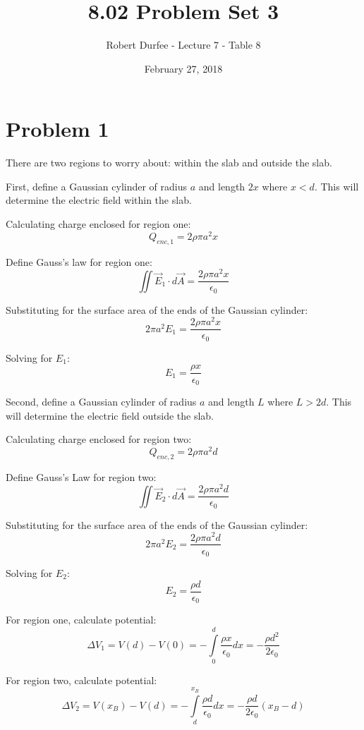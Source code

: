 \documentclass{article}
\title{ 8.02 Problem Set 3 }
\author{ Robert Durfee - Lecture 7 - Table 8 }
\date{ February 27, 2018 }
\begin{document}
\maketitle

\section*{ Problem 1 }

There are two regions to worry about: within the slab and outside the slab.

\bigbreak

First, define a Gaussian cylinder of radius $a$ and length $2x$ where $x < d$.
This will determine the electric field within the slab.

\bigbreak

Calculating charge enclosed for region one:
$$ Q_{enc,1} = 2 \rho \pi a^{2} x $$

Define Gauss's law for region one:
$$ \iint \vec{E}_{1} \cdot d\vec{A} = \frac{ 2 \rho \pi a^{2} x }{ \epsilon_{0} } $$

Substituting for the surface area of the ends of the Gaussian cylinder:
$$ 2 \pi a^{2} E_{1} = \frac{ 2 \rho \pi a^{2} x }{ \epsilon_{0} } $$

Solving for $E_{1}$:
$$ E_{1} = \frac{ \rho x }{ \epsilon_{0} }$$

Second, define a Gaussian cylinder of radius $a$ and length $L$ where $L > 2d$.
This will determine the electric field outside the slab.

\bigbreak

Calculating charge enclosed for region two:
$$ Q_{enc,2} = 2 \rho \pi a^{2} d$$

Define Gauss's Law for region two:
$$ \iint \vec{E}_{2} \cdot d\vec{A} = \frac{ 2 \rho \pi a^{2} d }{ \epsilon_{0} } $$

Substituting for the surface area of the ends of the Gaussian cylinder:
$$ 2 \pi a^{2} E_{2} = \frac{ 2 \rho \pi a^{2} d }{ \epsilon_{0} } $$

Solving for $E_{2}$:
$$ E_{2} = \frac{ \rho d }{ \epsilon_{0} } $$

For region one, calculate potential:
$$ \Delta V_{1} = V(d) - V(0) = - \int\limits_{0}^{d} \frac{ \rho x }{
\epsilon_{0} } dx = -\frac{ \rho d^{2} }{ 2 \epsilon_{0} } $$

For region two, calculate potential:
$$ \Delta V_{2} = V(x_{B}) - V(d) = - \int\limits_{d}^{x_{B}} \frac{ \rho d }{
\epsilon_{0} } dx = -\frac{ \rho d }{ 2 \epsilon_{0} }\left( x_{B} - d \right)$$
\end{document}
